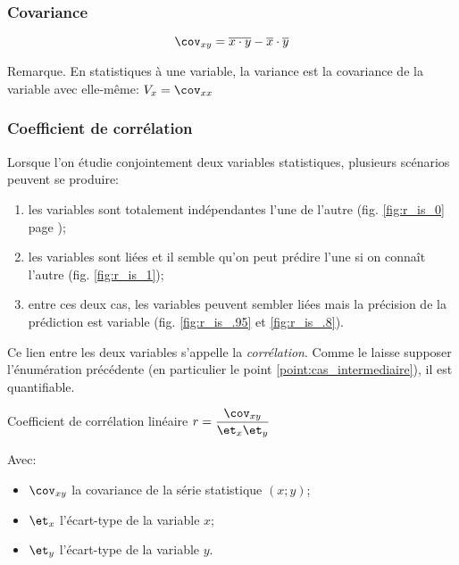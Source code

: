 \documentclass[a4paper,12pt]{scrartcl}
\begin{document}

\subsubsection{Covariance}

\begin{equation}
\cov_{xy} = \overline{x \cdot y} - \overline{x} \cdot \overline{y}
\end{equation}

Remarque. En statistiques à une variable, la variance est la covariance de la variable avec elle-même: $V_x = \cov_{xx}$

\subsubsection{Coefficient de corrélation}

Lorsque l'on étudie conjointement deux variables statistiques, plusieurs scénarios peuvent se produire:

\begin{enumerate}
\item les variables sont totalement indépendantes l'une de l'autre (fig. \ref{fig:r_is_0} page \pageref{fig:r_is_0});
\item les variables sont liées et il semble qu'on peut prédire l'une si on connaît l'autre (fig. \ref{fig:r_is_1});
\item \label{point:cas_intermediaire} entre ces deux cas, les variables peuvent sembler liées mais la précision de la prédiction est variable (fig. \ref{fig:r_is_.95} et \ref{fig:r_is_.8}).
\end{enumerate}

Ce lien entre les deux variables s'appelle la \emph{corrélation}. Comme le laisse supposer l'énumération précédente (en particulier le point \ref{point:cas_intermediaire}), il est quantifiable.

\begin{definition}{Coefficient de corrélation linéaire} 
$r = \dfrac{\cov_{xy}}{\et_x \et_y}$
\end{definition}

Avec:

\begin{itemize}
\item $\cov_{xy}$ la covariance de la série statistique $(x;y)$;
\item $\et_x$ l'écart-type de la variable $x$;
\item $\et_y$ l'écart-type de la variable $y$.
\end{itemize}
\end{document}
